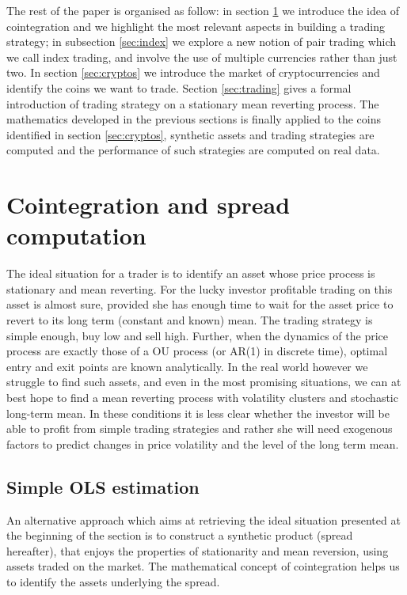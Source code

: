 \documentclass[a4paper,11pt]{article}
\theoremstyle{remark}
\theoremstyle{plain}
\begin{document}
The rest of the paper is organised as follow: in section \ref{sec:cointegration} we introduce the idea of cointegration and we highlight the most relevant aspects in building a trading strategy; in subsection \ref{sec:index} we explore a new notion of pair trading which we call index trading, and involve the  use of multiple currencies rather than just two. In section \ref{sec:cryptos} we introduce the market of cryptocurrencies and identify the coins we want to trade. Section \ref{sec:trading} gives a formal introduction of trading strategy on a stationary mean reverting process. The mathematics developed in the previous sections is finally applied to the coins identified in section \ref{sec:cryptos}, synthetic assets and trading strategies are computed and the performance of such strategies are computed on real data. 

\section{Cointegration and spread computation}
\label{sec:cointegration}
The ideal situation for a trader is to identify an asset whose price process is stationary and mean reverting. For the lucky investor profitable trading on this asset is almost sure, provided she has enough time to wait for the asset price to revert to its long term (constant and known) mean. The trading strategy is simple enough, buy low and sell high. Further, when the dynamics of the price process are exactly those of a OU process (or AR(1) in discrete time), optimal entry and exit points are known analytically.
In the real world however we struggle to find such assets, and even in the most promising situations, we can at best hope to find a mean reverting process with volatility clusters and stochastic long-term mean. In these conditions it is less clear whether the investor will be able to profit from simple trading strategies and rather she will need exogenous factors to predict changes in price volatility and the level of the long term mean.

\subsection{Simple OLS estimation}
\label{sub:simple_OLS}

An alternative approach which aims at retrieving the ideal situation presented at the beginning of the section is to construct a synthetic product (spread hereafter), that enjoys the properties of stationarity and mean reversion, using assets traded on the market. The mathematical concept of cointegration helps us to identify the assets underlying the spread.
\end{document}
